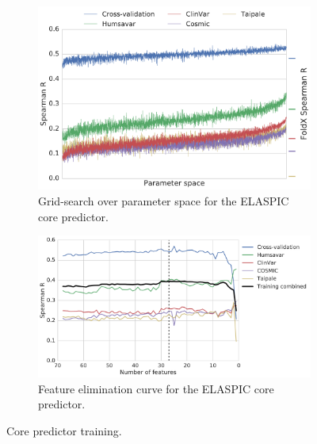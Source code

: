 
\begin{figure}[ht]
	\centering

	\begin{subfigure}[b]{1.0\textwidth}
		\centering
		\includegraphics[width=0.6\linewidth]{static/elaspic_training_set/machine_learning/gridsearch_core.pdf}
		\caption{Grid-search over parameter space for the ELASPIC core predictor.}
		\label{fig:gridsearch_core}
	\end{subfigure}

	\begin{subfigure}[b]{1\textwidth}
		\centering
		\includegraphics[width=0.75\linewidth]{static/elaspic_training_set/machine_learning/feature_elimination_core.pdf}
		\caption{Feature elimination curve for the ELASPIC core predictor.}
		\label{fig:feature_elimination_core}
	\end{subfigure}

	\caption{Core predictor training.}
\end{figure}


